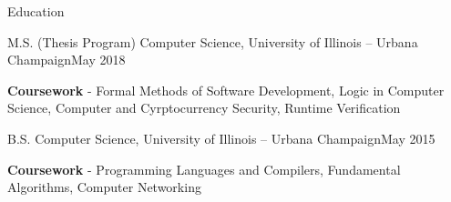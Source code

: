 \documentclass{resume} %
\begin{document}
    
\begin{rSection}{Education}
    \begin{rSubsection}{ M.S. (Thesis Program) Computer Science, University of Illinois -- Urbana Champaign}{May 2018}{}{}
    \item \textbf{Coursework} - Formal Methods of Software Development, Logic in Computer Science, Computer and Cyrptocurrency Security, Runtime Verification
\end{rSubsection}
\begin{rSubsection}{ B.S. Computer Science, University of Illinois -- Urbana Champaign}{May 2015}{}{}
    \item \textbf{Coursework} - Programming Languages and Compilers, Fundamental Algorithms, Computer Networking
\end{rSubsection}
\end{rSection}
\end{document}
